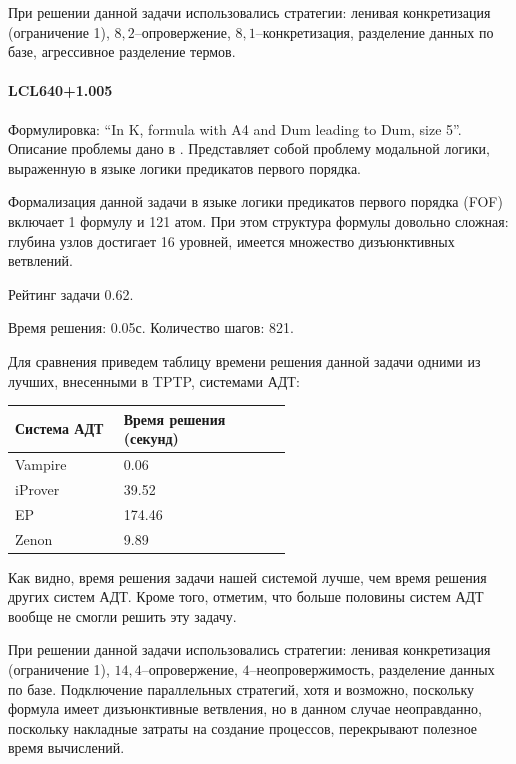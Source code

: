 При решении данной задачи использовались стратегии: ленивая конкретизация (ограничение 1), $8,2$--опровержение, $8,1$--конкретизация, разделение данных по базе, агрессивное разделение термов.


\paragraph{LCL640+1.005}
Формулировка: ``In K, formula with A4 and Dum leading to Dum, size 5''. Описание проблемы дано в \cite{SourceLCL}. Представляет собой проблему модальной логики, выраженную в языке логики предикатов первого порядка.

Формализация данной задачи в языке логики предикатов первого порядка (FOF) включает 1 формулу и 121 атом. При этом структура формулы довольно сложная: глубина узлов достигает 16 уровней, имеется множество дизъюнктивных ветвлений.

Рейтинг задачи 0.62. %

Время решения: 0.05с. Количество шагов: 821.

Для сравнения приведем таблицу времени решения данной задачи одними из лучших, внесенными в TPTP, системами АДТ:

\begin{longtable}[H]{|p{0.2\linewidth}|p{0.35\linewidth}|}
\hline
\textbf{Система АДТ} & \textbf{Время решения (секунд)}  \\
\hline
Vampire & 0.06 \\
\hline
iProver & 39.52 \\
\hline
EP & 174.46  \\
\hline
Zenon & 9.89 \\
\hline
\end{longtable}


Как видно, время решения задачи нашей системой лучше, чем время решения других систем АДТ. Кроме того, отметим, что больше половины систем АДТ вообще не смогли решить эту задачу.

При решении данной задачи использовались стратегии: ленивая конкретизация (ограничение 1), $14,4$--опровержение, $4$--неопровержимость, разделение данных по базе. Подключение параллельных стратегий, хотя и возможно, поскольку формула имеет дизъюнктивные ветвления, но в данном случае неоправданно, поскольку накладные затраты на создание процессов, перекрывают полезное время вычислений.



